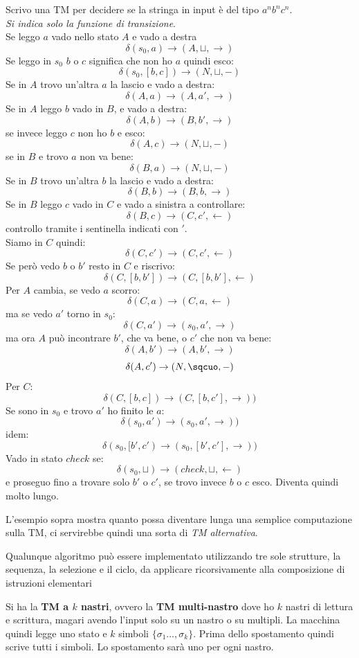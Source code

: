 \documentclass[a4paper,12pt, oneside]{book}
\begin{document}
\begin{esempio}
  Scrivo una TM per decidere se la stringa in input è del tipo $a^nb^nc^n$.\\
  \textit{Si indica solo la funzione di transizione}.\\
  Se leggo $a$ vado nello stato $A$ e vado a destra
  \[\delta(s_0,a)\to (A,\sqcup, \rightarrow)\]
  Se leggo in $s_0$ $b$ o $c$ significa che non ho $a$ quindi esco:
  \[\delta(s_0,[b,c])\to (N,\sqcup, -)\]
  Se in $A$ trovo un'altra $a$ la lascio e vado a destra:
  \[\delta(A,a)\to (A,a', \rightarrow)\]
  Se in $A$ leggo $b$ vado in $B$, e vado a destra:
  \[\delta(A,b)\to (B,b', \rightarrow)\]
  se invece leggo $c$ non ho $b$ e esco:
  \[\delta(A,c)\to (N,\sqcup, -)\]
  se in $B$ e trovo $a$ non va bene:
  \[\delta(B,a)\to (N,\sqcup, -)\]
  Se in $B$ trovo un'altra $b$ la lascio e vado a destra:
  \[\delta(B,b)\to (B,b, \rightarrow)\]
  Se in $B$ leggo $c$ vado in $C$ e vado a sinistra a controllare:
  \[\delta(B,c)\to (C,c', \leftarrow)\]
  controllo tramite i sentinella indicati con $'$.\\
  Siamo in $C$ quindi:
  \[\delta(C,c')\to (C,c', \leftarrow)\]
  Se però vedo $b$ o $b'$ resto in $C$ e riscrivo:
  \[\delta(C,[b,b'])\to (C,[b,b'], \leftarrow)\]
  Per $A$ cambia, se vedo $a$ scorro:
  \[\delta(C,a)\to (C,a, \leftarrow)\]
  ma se vedo $a'$ torno in $s_0$:
  \[\delta(C,a')\to (s_0,a', \rightarrow)\]
  ma ora $A$ può incontrare $b'$, che va bene, o $c'$ che non va bene:
  \[\delta(A,b')\to (A,b', \rightarrow)\]
  \[\delta(A,c')\to (N,\sqcuo, -)\]
  Per $C$:
  \[\delta(C,[b,c])\to (C,[b,c'], \rightarrow))\]
  Se sono in $s_0$ e trovo $a'$ ho finito le $a$:
  \[\delta(s_0,a')\to (s_0,a' , \rightarrow))\]
  idem:
  \[\delta(s_0,[b',c')\to (s_0,[b',c'] , \rightarrow))\]
  Vado in stato $check$ se:
  \[\delta(s_0,\sqcup)\to(check,\sqcup, \leftarrow)\]
  e proseguo fino a trovare solo $b'$ o $c'$, se trovo invece $b$ o $c$ esco.
  Diventa quindi molto lungo.
\end{esempio}
L'esempio sopra mostra quanto possa diventare lunga una semplice computazione
sulla TM, ci servirebbe quindi una sorta di \textit{TM alternativa}.
\begin{teorema}
  Qualunque algoritmo può essere implementato utilizzando tre sole strutture, la
  sequenza, la selezione e il ciclo, da applicare ricorsivamente alla
  composizione di istruzioni elementari
\end{teorema}
\begin{definizione}
  Si ha la \textbf{TM a $k$ nastri}, ovvero la \textbf{TM
    multi-nastro} dove ho $k$ nastri di lettura e scrittura, magari avendo
  l'input solo su un nastro o su multipli. La macchina quindi legge uno stato e
  $k$ simboli $\{\sigma_1\ldots,\sigma_k\}$. Prima dello spostamento quindi
  scrive tutti i simboli. Lo spostamento sarà uno per ogni nastro.
\end{definizione}
\end{document}
